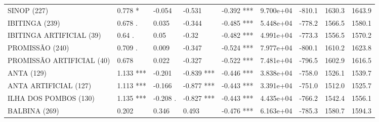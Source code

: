 \documentclass[12pt,oneside]{book}\usepackage[]{graphicx}\usepackage[]{color}
\newenvironment{knitrout}{}{} %
\theoremstyle{definition} %
\begin{document}
\begin{knitrout}
\begin{table}
{\begin{tabular}[t]{lllllrrrr}
SINOP (227) & 0.778 * & -0.054 & -0.531 & -0.392 *** & 9.700e+04 & -810.1 & 1630.3 & 1643.9\\
\rowcolor{gray!6}  IBITINGA (239) & 0.678 . & 0.035 & -0.344 & -0.485 *** & 5.448e+04 & -778.2 & 1566.5 & 1580.1\\
IBITINGA ARTIFICIAL (39) & 0.64 . & 0.05 & -0.32 & -0.482 *** & 4.991e+04 & -773.3 & 1556.5 & 1570.2\\
\rowcolor{gray!6}  PROMISSÃO (240) & 0.709 . & 0.009 & -0.347 & -0.524 *** & 7.977e+04 & -800.1 & 1610.2 & 1623.8\\
\addlinespace
PROMISSÃO ARTIFICIAL (40) & 0.678 & 0.022 & -0.327 & -0.522 *** & 7.481e+04 & -796.5 & 1602.9 & 1616.5\\
\rowcolor{gray!6}  ANTA (129) & 1.133 *** & -0.201 & -0.839 *** & -0.446 *** & 3.838e+04 & -758.0 & 1526.1 & 1539.7\\
ANTA ARTIFICIAL (127) & 1.113 *** & -0.166 & -0.877 *** & -0.443 *** & 3.391e+04 & -751.0 & 1512.0 & 1525.7\\
\rowcolor{gray!6}  ILHA DOS POMBOS (130) & 1.135 *** & -0.208 . & -0.827 *** & -0.443 *** & 4.435e+04 & -766.2 & 1542.4 & 1556.1\\
BALBINA (269) & 0.202 & 0.346 & 0.493 & -0.476 *** & 6.163e+04 & -785.3 & 1580.7 & 1594.3\\
\bottomrule
\end{tabular}}
\end{table}


\end{knitrout}
\end{document}
